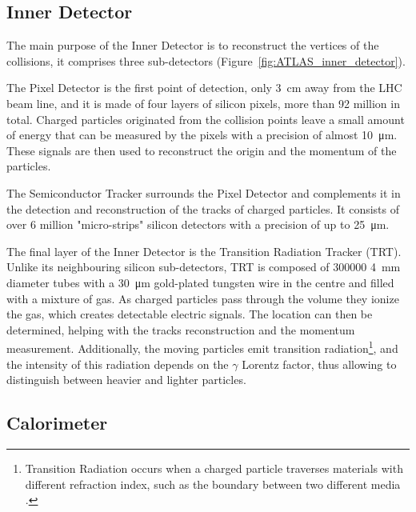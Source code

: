 \subsection{Inner Detector}\label{sec:ATLAS_inner_detector}
\marginpar{\flushleft }
The main purpose of the Inner Detector is to reconstruct the vertices of the collisions, it comprises three sub-detectors (Figure~\ref{fig:ATLAS_inner_detector}).

The Pixel Detector is the first point of detection, only \qty{3}{\centi\meter} away from the LHC beam line, and it is made of four layers of silicon pixels, more than 92 million in total. Charged particles originated from the collision points leave a small amount of energy that can be measured by the pixels with a precision of almost \qty{10}{\micro\meter}. These signals are then used to reconstruct the origin and the momentum of the particles.

The Semiconductor Tracker surrounds the Pixel Detector and complements it in the detection and reconstruction of the tracks of charged particles. It consists of over 6 million "micro-strips" silicon detectors with a precision of up to \qty{25}{\micro\meter}.

The final layer of the Inner Detector is the Transition Radiation Tracker (TRT). Unlike its neighbouring silicon sub-detectors, TRT is composed of \num{300000} \qty{4}{\milli\meter} diameter tubes with a \qty{30}{\micro\meter} gold-plated tungsten wire in the centre and filled with a mixture of gas. As charged particles pass through the volume they ionize the gas, which creates detectable electric signals. The location can then be determined, helping with the tracks reconstruction and the momentum measurement. Additionally, the moving particles emit transition radiation\footnote{Transition Radiation occurs when a charged particle traverses materials with different refraction index, such as the boundary between two different media \cite{wikipediaTransitionRadiation}.}, and the intensity of this radiation depends on the \(\gamma\) Lorentz factor, thus allowing to distinguish between heavier and lighter particles.


\subsection{Calorimeter}\label{sec:ATLAS_calorimeter}


